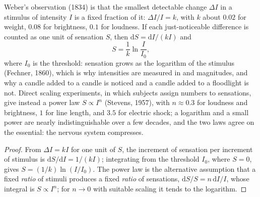 \begin{theorem}\label{thm:b3:sensory-systems:weber}
Weber's observation (1834) is that the smallest detectable change
$\Delta I$ in a stimulus of intensity $I$ is a fixed fraction of it:
$\Delta I/I = k$, with $k$ about $0.02$ for weight, $0.08$ for
brightness, $0.1$ for loudness. If each just-noticeable difference is
counted as one unit of sensation $S$, then $\mathrm{d}S = \mathrm{d}I/
(kI)$ and
\[
S = \frac{1}{k}\ln\frac{I}{I_{0}} ,
\]
where $I_{0}$ is the threshold: sensation grows as the logarithm of the
stimulus (Fechner, 1860), which is why intensities are measured in
 and magnitudes, and why a candle added to a candle is
noticed and a candle added to a floodlight is not. Direct scaling
experiments, in which subjects assign numbers to sensations, give
instead a power law $S \propto I^{n}$ (Stevens, 1957), with $n \approx
0.3$ for loudness and brightness, $1$ for line length, and $3.5$ for
electric shock; a logarithm and a small power are nearly
indistinguishable over a few decades, and the two laws agree on the
essential: the nervous system compresses.
\end{theorem}
\begin{proof}
From $\Delta I = kI$ for one unit of $S$, the increment of sensation
per increment of stimulus is $\mathrm{d}S/\mathrm{d}I = 1/(kI)$;
integrating from the threshold $I_{0}$, where $S = 0$, gives $S = (1/k)
\ln(I/I_{0})$. The power law is the alternative assumption that a fixed
\emph{ratio} of stimuli produces a fixed \emph{ratio} of sensations,
$\mathrm{d}S/S = n\,\mathrm{d}I/I$, whose integral is $S \propto I^{n}$;
for $n \to 0$ with suitable scaling it tends to the logarithm.
\end{proof}

